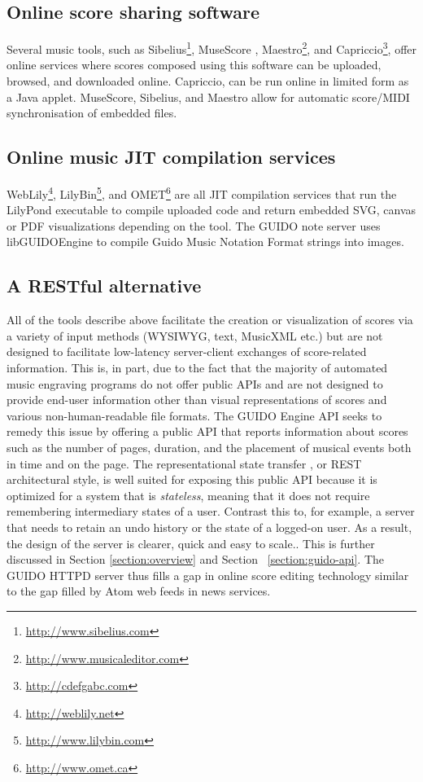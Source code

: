 \documentclass[11pt,a4paper]{article}
\newcommand{\footurl}[1]	{\footnote{\url{#1}}}
\begin{document}
\subsection{Online score sharing software}\label{subsection:sharing}
Several music tools, such as Sibelius\footurl{http://www.sibelius.com}, MuseScore \cite{musescore}, Maestro\footurl{http://www.musicaleditor.com}, and Capriccio\footurl{http://cdefgabc.com}, offer online services where scores composed using this software can be uploaded, browsed, and downloaded online.  Capriccio, can be run online in limited form as a Java applet.  MuseScore, Sibelius, and Maestro allow for automatic score/MIDI synchronisation of embedded files.
\subsection{Online music JIT compilation services}\label{subsection:jit}
WebLily\footurl{http://weblily.net}, LilyBin\footurl{http://www.lilybin.com}, and OMET\footurl{http://www.omet.ca} are all JIT compilation services that run the LilyPond executable to compile uploaded code and return embedded SVG, canvas or PDF visualizations depending on the tool.  The GUIDO note server \cite{renz98} uses libGUIDOEngine to compile Guido Music Notation Format \cite{hoos98} strings into images.
\subsection{A RESTful alternative}\label{subsection:restful}

All of the tools describe above facilitate the creation or visualization of scores via a variety of input methods (WYSIWYG, text, MusicXML etc.) but are not designed to facilitate low-latency server-client exchanges of score-related information.  This is, in part, due to the fact that the majority of automated music engraving programs do not offer public APIs and are not designed to provide end-user information other than visual representations of scores and various non-human-readable file formats.  The GUIDO Engine API \cite{Dau09a}\cite{guidolib1.52} seeks to remedy this issue by offering a public API that reports information about scores such as the number of pages, duration, and the placement of musical events both in time and on the page.  The representational state transfer \cite{Fielding00}, or REST architectural style, is well suited for exposing this public API because it is optimized for a system that is \emph{stateless}, meaning that it does not require remembering intermediary states of a user.  Contrast this to, for example, a server that needs to retain an undo history or the state of a logged-on user.  As a result, the design of the server is clearer, quick and easy to scale.\cite{richardson2008restful}.  This is further discussed in Section \ref{section:overview} and Section ~\ref{section:guido-api}.  The GUIDO HTTPD server thus fills a gap in online score editing technology similar to the gap filled by Atom web feeds in news services.
\end{document}
